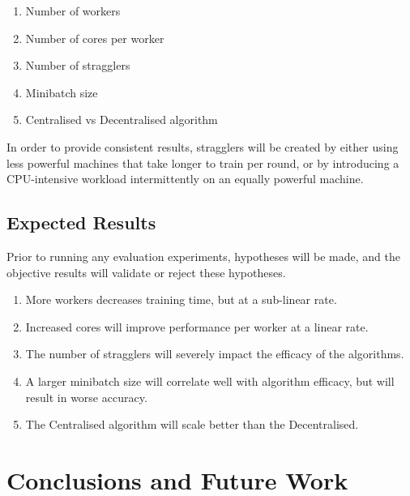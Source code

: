 \documentclass[12pt]{article}
\begin{document}
\begin{enumerate}
\item Number of workers
\item Number of cores per worker
\item Number of stragglers
\item Minibatch size
\item Centralised vs Decentralised algorithm
\end{enumerate}

In order to provide consistent results, stragglers will be created by either using less powerful machines that  take longer to train per round, or by introducing a CPU-intensive workload intermittently on an equally powerful machine.

\subsection{Expected Results}
Prior to running any evaluation experiments, hypotheses will be made, and the objective results will validate or reject these hypotheses.

\begin{enumerate}
\item More workers decreases training time, but at a sub-linear rate.
\item Increased cores will improve performance per worker at a linear rate.
\item The number of stragglers will severely impact the efficacy of the algorithms.
\item A larger minibatch size will correlate well with algorithm efficacy, but will result in worse accuracy.
\item The Centralised algorithm will scale better than the Decentralised.
\end{enumerate}

\newpage

\section{Conclusions and Future Work}

\newpage



\end{document}
